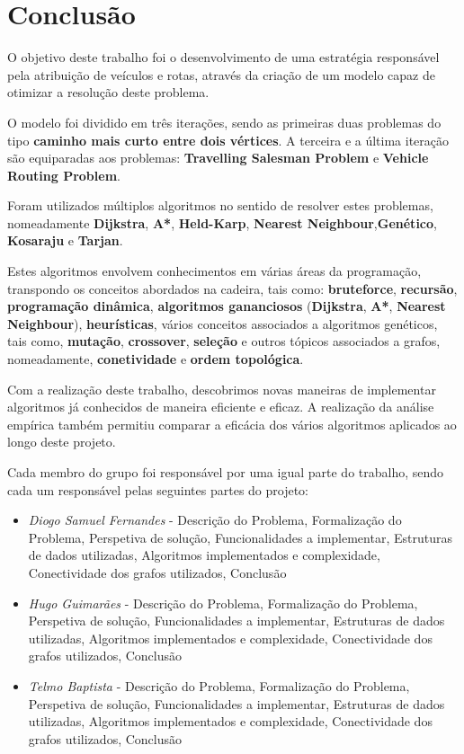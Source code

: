 \documentclass[article, a4paper, 12pt, oneside]{memoir}
\begin{document}
\newpage
\chapter[Conclusão][Conclusão]{Conclusão} \label{\thechapter}

O objetivo deste trabalho foi o desenvolvimento de uma estratégia responsável pela atribuição de veículos e rotas, através da criação de um modelo capaz de otimizar a resolução deste problema.

O modelo foi dividido em três iterações, sendo as primeiras duas problemas do tipo \textbf{caminho mais curto entre dois vértices}. A terceira e a última iteração são equiparadas aos problemas: \textbf{Travelling Salesman Problem} e \textbf{Vehicle Routing Problem}.

Foram utilizados múltiplos algoritmos no sentido de resolver estes problemas, nomeadamente \textbf{Dijkstra}, \textbf{A*}, \textbf{Held-Karp}, \textbf{Nearest Neighbour},\textbf{Genético}, \textbf{Kosaraju} e \textbf{Tarjan}.

Estes algoritmos envolvem conhecimentos em várias áreas da programação, transpondo os conceitos abordados na cadeira, tais como: \textbf{bruteforce}, \textbf{recursão}, \textbf{programação dinâmica}, \textbf{algoritmos gananciosos} (\textbf{Dijkstra}, \textbf{A*}, \textbf{Nearest Neighbour}), \textbf{heurísticas}, vários conceitos associados a algoritmos genéticos, tais como, \textbf{mutação}, \textbf{crossover}, \textbf{seleção} e outros tópicos associados a grafos, nomeadamente, \textbf{conetividade} e  \textbf{ordem topológica}.

Com a realização deste trabalho, descobrimos novas maneiras de implementar algoritmos já conhecidos de maneira eficiente e eficaz. A realização da análise empírica também permitiu comparar a eficácia dos vários algoritmos aplicados ao longo deste projeto.

Cada membro do grupo foi responsável por uma igual parte do trabalho, sendo cada um responsável pelas seguintes partes do projeto:
\begin{itemize}
	\item\emph{ Diogo Samuel Fernandes} - Descrição do Problema, Formalização do Problema, Perspetiva de solução, Funcionalidades a implementar, Estruturas de dados utilizadas, Algoritmos implementados e complexidade, Conectividade dos grafos utilizados, Conclusão
	\item\emph{ Hugo Guimarães} - Descrição do Problema, Formalização do Problema, Perspetiva de solução, Funcionalidades a implementar, Estruturas de dados utilizadas, Algoritmos implementados e complexidade, Conectividade dos grafos utilizados, Conclusão
	\item\emph{ Telmo Baptista} - Descrição do Problema, Formalização do Problema, Perspetiva de solução, Funcionalidades a implementar, Estruturas de dados utilizadas, Algoritmos implementados e complexidade, Conectividade dos grafos utilizados, Conclusão
\end{itemize}
\end{document}
